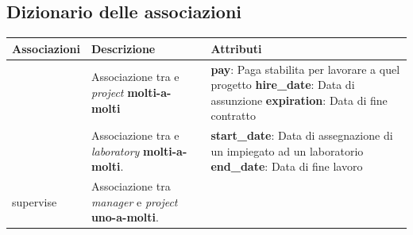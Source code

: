 \newpage
\subsection{Dizionario delle associazioni}
\begin{tabular}{@{}| p{} | p{} | p{} |}
	\hline
	Associazioni      & Descrizione                                                                               & Attributi \\
	\hline
	\workson          & \begin{minipage}[t]{0.4\textwidth}
		                    \raggedright
		                    Associazione tra \textit{\projectsalaried} e \textit{project} \textbf{molti-a-molti}
	                    \end{minipage}      & \begin{minipage}[t]{0.3\textwidth}
		                                          \raggedright
		                                          \textbf{pay}: Paga stabilita per lavorare a quel progetto\sskip
		                                          \textbf{hire\_date}: Data di assunzione\sskip
		                                          \textbf{expiration}: Data di fine contratto
	                                          \end{minipage}
	\\[70pt]
	\hline
	\worksat          & \begin{minipage}[t]{0.4\textwidth}
		                    \raggedright
		                    Associazione tra \textit{\baseemp} e \textit{laboratory} \textbf{molti-a-molti}.
	                    \end{minipage}
	                  & \begin{minipage}[t]{0.3\textwidth}
		                    \raggedright
		                    \textbf{start\_date}: Data di assegnazione di un impiegato ad un laboratorio\sskip
		                    \textbf{end\_date}: Data di fine lavoro
	                    \end{minipage}                     \\[55pt]
	\hline
	supervise         & \begin{minipage}[t]{0.4\textwidth}
		                    \raggedright
		                    Associazione tra \textit{manager} e \textit{project} \textbf{uno-a-molti}.
	                    \end{minipage}
	                  &                                                                                                       \\[15pt]

\end{tabular}
